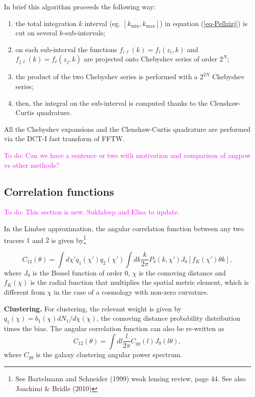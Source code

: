 \documentclass[\docopts]{\docclass}
\newcommand{\todo}[1]{\textcolor{magenta}{To do: #1}}
\begin{document}
In brief this algorithm proceeds the following way:
\begin{enumerate}
\item the total integration $k$ interval (eg. $[k_\mathrm{min}, k_\mathrm{max}]$) in equation (\ref{eq-Pellzizj}) is cut on several $k$-sub-intervals;
\item  on each sub-interval the functions $f_{i\, \ell}(k) = f_\ell(z_i,k) $ and $f_{j\, \ell}(k) = f_\ell(z_j,k)$ are projected onto Chebyshev series of order $2^N$;
\item the product of the two Chebyshev series is performed with a $2^{2N}$ Chebyshev series; 
\item then, the integral on the sub-interval is computed thanks to the Clenshaw-Curtis quadrature.   
\end{enumerate}
All the Chebyshev expansions and the Clenshaw-Curtis quadrature are
performed via the DCT-I fast transform of FFTW. 

\todo{Can we have a sentence or two with motivation and comparison of angpow vs other methods?}

\subsection{Correlation functions}
\label{sec:corr}

\todo{This section is new. Sukhdeep and Elisa to update.}

In the Limber approximation, the angular correlation function between any two tracers $1$ and $2$ is given by\footnote{See Bartelmann and Schneider (1999) weak lensing review, page 44. See also Joachimi \& Bridle (2010)}

\begin{equation}
C_{12}(\theta) = \int d\chi'q_1(\chi')q_2(\chi')\int dk\frac{k}{2\pi}P_{\delta}(k,\chi')J_0[f_K(\chi')\theta k],
\end{equation}
%
where $J_0$ is the Bessel function of order 0, $\chi$ is the comoving distance and $f_K(\chi)$ is the radial function that multiplies the spatial metric element, which is different from $\chi$ in the case of a cosmology with non-zero curvature.

{\bf Clustering.} For clustering, the relevant weight is given by $q_1(\chi)=b_1(\chi)dN_1/d\chi(\chi)$, the comoving distance probability distribution times the bias. The angular correlation function can also be re-written as
\begin{equation}
C_{12}(\theta) = \int dl \frac{l}{2\pi} C_{gg}(l) J_0(l\theta),
\end{equation}
where $C_{gg}$ is the galaxy clustering angular power spectrum.
\end{document}
